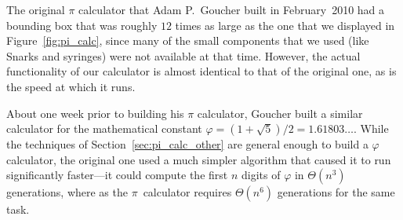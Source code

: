 The original $\pi$ calculator that Adam P.~Goucher built in February~2010 had a bounding box that was roughly $12$ times as large as the one that we displayed in Figure~\ref{fig:pi_calc}, since many of the small components that we used (like Snarks and syringes) were not available at that time. However, the actual functionality of our calculator is almost identical to that of the original one, as is the speed at which it runs.

About one week prior to building his $\pi$ calculator, Goucher built a similar calculator for the mathematical constant $\varphi = (1+\sqrt{5})/2 = 1.61803\ldots$. While the techniques of Section~\ref{sec:pi_calc_other} are general enough to build a $\varphi$ calculator, the original one used a much simpler algorithm that caused it to run significantly faster---it could compute the first $n$ digits of $\varphi$ in $\Theta(n^3)$ generations, where as the $\pi$~calculator requires $\Theta(n^6)$ generations for the same task.




